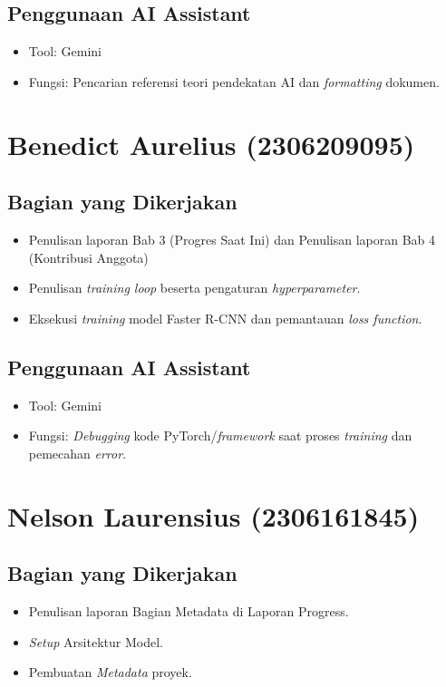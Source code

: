 \documentclass[11pt,a4paper,oneside]{report}
\begin{document}
\subsection*{Penggunaan AI Assistant}
\begin{itemize}
    \item Tool: Gemini
    \item Fungsi: Pencarian referensi teori pendekatan AI dan \textit{formatting} dokumen.
\end{itemize}

\section{Benedict Aurelius (2306209095)}

\subsection*{Bagian yang Dikerjakan}
\begin{itemize}
    \item Penulisan laporan Bab 3 (Progres Saat Ini) dan Penulisan laporan Bab 4 (Kontribusi Anggota)
    \item Penulisan \textit{training loop} beserta pengaturan \textit{hyperparameter}.
    \item Eksekusi \textit{training} model Faster R-CNN dan pemantauan \textit{loss function}.
\end{itemize}

\subsection*{Penggunaan AI Assistant}
\begin{itemize}
    \item Tool: Gemini
    \item Fungsi: \textit{Debugging} kode PyTorch/\textit{framework} saat proses \textit{training} dan pemecahan \textit{error}.
\end{itemize}

\section{Nelson Laurensius (2306161845)}

\subsection*{Bagian yang Dikerjakan}
\begin{itemize}
    \item Penulisan laporan Bagian Metadata di Laporan Progress.
    \item \textit{Setup} Arsitektur Model.
    \item Pembuatan \textit{Metadata} proyek.
\end{itemize}
\end{document}
